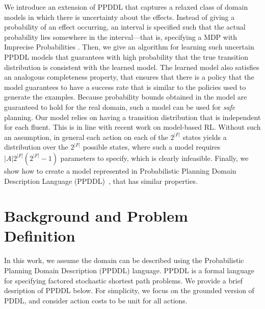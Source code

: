 \documentclass[letterpaper]{article} %
\begin{document}
We introduce an extension of PPDDL that captures a relaxed class of domain models in which there is uncertainty about the effects. Instead of giving a probability of an effect occurring, an interval is specified such that the actual probability lies somewhere in the interval---that is, specifying a MDP with Imprecise Probabilities \cite{satia1973markovian}. Then, we give an algorithm for learning such uncertain PPDDL models that guarantees with high probability that the true transition distribution is consistent with the learned model. The learned model also satisfies an analogous completeness property, that ensures that there is a policy that the model guarantees to have a success rate that is similar to the policies used to generate the examples. Because probability bounds obtained in the model are guaranteed to hold for the real domain, such a model can be used for \emph{safe} planning. 
Our model relies on having a transition distribution that is independent for each fluent. 
This is in line with recent work on model-based RL. Without such an assumption, in general each action on each of the $2^{|F|}$ states yields a distribution over the $2^{|F|}$ possible states, where such a model requires $|A|2^{|F|}(2^{|F|}-1)$ parameters to specify, which is clearly infeasible.
Finally, we show how to create a model represented in Probabilistic Planning Domain Description Language (PPDDL)~\cite{younes2004ppddl1}, that has similar properties. 


 


\section{Background and Problem Definition}



In this work, we assume the domain can be described using the Probabilistic Planning Domain Description (PPDDL) language. 
PPDDL is a formal language for specifying factored stochastic shortest path problems. We provide a brief desription of PPDDL below. 
For simplicity, we focus on the grounded version of PDDL, and consider action costs to be unit for all actions. 
\end{document}
